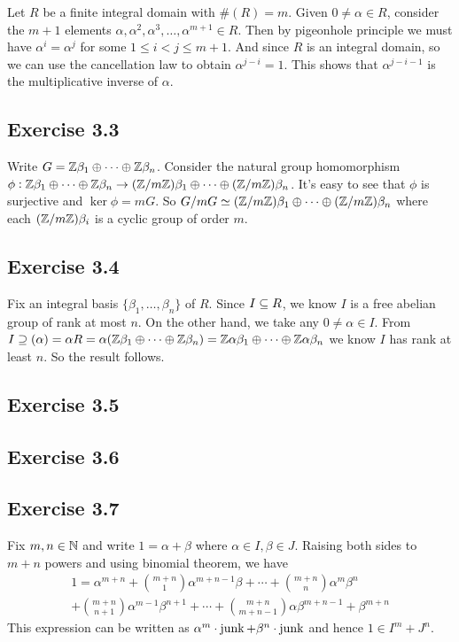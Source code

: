 \documentclass[../Marcus.tex]{subfiles}
\begin{document}
Let $R$ be a finite integral domain with $\#(R)=m$. Given $0\neq\alpha\in R$, consider the $m+1$ elements $\alpha,\alpha^2,\alpha^3,\ldots,\alpha^{m+1}\in R$. Then by pigeonhole principle we must have $\alpha^i=\alpha^j$ for some $1\leq i<j \leq m+1$. And since $R$ is an integral domain, so we can use the cancellation law to obtain $\alpha^{j-i}=1$. This shows that $\alpha^{j-i-1}$ is the multiplicative inverse of $\alpha$.

\subsection*{Exercise 3.3}

Write $G=\mathbb{Z}\beta_1\oplus\cdots\oplus\mathbb{Z}\beta_n$. Consider the natural group homomorphism $\phi:\mathbb{Z}\beta_1\oplus\cdots\oplus\mathbb{Z}\beta_n \to (\mathbb{Z}/m\mathbb{Z})\beta_1\oplus\cdots\oplus(\mathbb{Z}/m\mathbb{Z})\beta_n$. It's easy to see that $\phi$ is surjective and $\ker\phi=mG$. So $G/mG\simeq (\mathbb{Z}/m\mathbb{Z})\beta_1\oplus\cdots\oplus(\mathbb{Z}/m\mathbb{Z})\beta_n$ where each $(\mathbb{Z}/m\mathbb{Z})\beta_i$ is a cyclic group of order $m$.

\subsection*{Exercise 3.4}

Fix an integral basis $\{\beta_1,\ldots,\beta_n\}$ of $R$. Since $I \subseteq R$, we know $I$ is a free abelian group of rank at most $n$. On the other hand, we take any  $0 \neq \alpha \in I$. From $I \supseteq (\alpha)=\alpha R = \alpha(\mathbb{Z}\beta_1\oplus\cdots\oplus\mathbb{Z}\beta_n) = \mathbb{Z}\alpha\beta_1\oplus\cdots\oplus\mathbb{Z}\alpha\beta_n$ we know $I$ has rank at least $n$. So the result follows.

\subsection*{Exercise 3.5}

\subsection*{Exercise 3.6}

\subsection*{Exercise 3.7}

Fix $m,n\in\mathbb{N}$ and write $1=\alpha+\beta$ where $\alpha\in I,\beta\in J$. Raising both sides to $m+n$ powers and using binomial theorem, we have
\begin{multline*}
    1=\alpha^{m+n}+\binom{m+n}{1}\alpha^{m+n-1}\beta+\cdots+\binom{m+n}{n}\alpha^m\beta^n \\ +\binom{m+n}{n+1}\alpha^{m-1}\beta^{n+1}+\cdots+\binom{m+n}{m+n-1}\alpha\beta^{m+n-1}+\beta^{m+n}
\end{multline*}
This expression can be written as $\alpha^m\cdot\operatorname{junk} + \beta^n\cdot\operatorname{junk}$ and hence $1\in I^m+J^n$.
\end{document}
